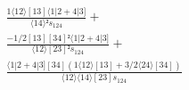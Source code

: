 \documentclass[varwidth, border=5pt]{standalone}
\begin{document}
\begin{my}
$\begin{gathered}
\scriptscriptstyle\frac{1⟨12⟩[13]⟨1|2+4|3]}{⟨14⟩²s_{124}} +\\
\scriptscriptstyle\frac{-1/2[13][34]²⟨1|2+4|3]}{⟨12⟩[23]²s_{124}} +\\
\scriptscriptstyle\frac{⟨1|2+4|3][34](1⟨12⟩[13]+3/2⟨24⟩[34])}{⟨12⟩⟨14⟩[23]s_{124}} \phantom{+}
\end{gathered}$
\end{my}
\end{document}
